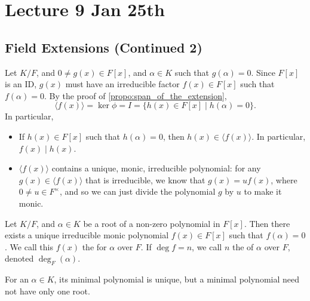 \documentclass[notoc,notitlepage,nobib]{tufte-book}
\begin{document}


\chapter{Lecture 9 Jan 25th}%
\label{chp:lecture_9_jan_25th}

\section{Field Extensions (Continued 2)}%
\label{sec:field_extensions_continued_2}

Let $K / F$, and $0 \neq g(x) \in F[x]$, and $\alpha \in K$ such that $g(\alpha) = 0$. Since $F[x]$ is an
ID, $g(x)$ must have an irreducible factor $f(x) \in F[x]$ such that $f(\alpha) = 0$. By the proof of
\cref{propo:span_of_the_extension},
\begin{equation*}
  \langle f(x) \rangle = \ker \phi = I = \{ h(x) \in F[x] \mid h(\alpha) = 0 \}.
\end{equation*}
In particular,
\begin{itemize}
  \item If $h(x) \in F[x]$ such that $h(\alpha) = 0$, then $h(x) \in \langle f(x) \rangle$. In particular,
    $f(x) \mid h(x)$.
  \item $\langle f(x) \rangle$ contains a unique, monic, irreducible polynomial: for any $g(x) \in 
    \langle f(x) \rangle$ that is irreducible, we know that $g(x) = uf(x)$, where $0 \neq u \in F^\times$,
    and so we can just divide the polynomial $g$ by $u$ to make it monic.
\end{itemize}

\begin{defn}\label{defn:minimal_polynomial}
  Let $K / F$, and $\alpha \in K$ be a root of a non-zero polynomial in $F[x]$. Then there exists a
  unique irreducible monic polynomial $f(x) \in F[x]$ such that $f(\alpha) = 0$. We call this $f(x)$
  the  for $\alpha$ over $F$. If $\deg f = n$, we call $n$ the 
  of $\alpha$ over $F$, denoted $\deg_F(\alpha)$.
\end{defn}

\begin{note}
  For an $\alpha \in K$, its minimal polynomial is unique, but a minimal polynomial need not have only
  one root.
\end{note}
\end{document}
